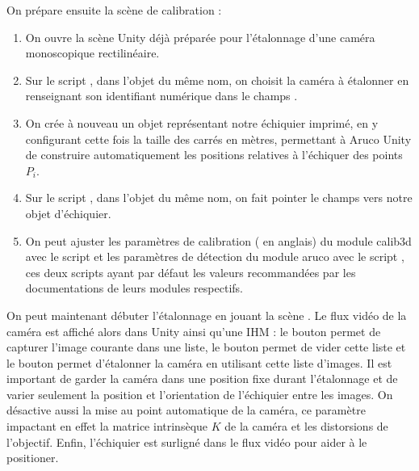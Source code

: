 On prépare ensuite la scène de calibration :
\begin{enumerate}
  \item On ouvre la scène Unity  déjà préparée pour l'étalonnage d'une caméra monoscopique rectilinéaire.
  \item Sur le script , dans l'objet du même nom, on choisit la caméra à étalonner en renseignant son identifiant numérique dans le champs .
  \item On crée à nouveau un objet représentant notre échiquier imprimé, en y configurant cette fois la taille des carrés en mètres, permettant à Aruco Unity de construire automatiquement les positions relatives à l'échiquer des points $P_i$.
  \item Sur le script , dans l'objet du même nom, on fait pointer le champs  vers notre objet d'échiquier.
  \item On peut ajuster les paramètres de calibration ( en anglais) du module calib3d avec le script  et les paramètres de détection du module aruco avec le script , ces deux scripts ayant par défaut les valeurs recommandées par les documentations de leurs modules respectifs.
\end{enumerate}


On peut maintenant débuter l'étalonnage en jouant la scène . Le flux vidéo de la caméra est affiché alors dans Unity ainsi qu'une IHM : le bouton  permet de capturer l'image courante dans une liste, le bouton  permet de vider cette liste et le bouton  permet d'étalonner la caméra en utilisant cette liste d'images. Il est important de garder la caméra dans une position fixe durant l'étalonnage et de varier seulement la position et l'orientation de l'échiquier entre les images. On désactive aussi la mise au point automatique de la caméra, ce paramètre impactant en effet la matrice intrinsèque	$K$ de la caméra et les distorsions de l'objectif. Enfin, l'échiquier est surligné dans le flux vidéo pour aider à le positioner.

